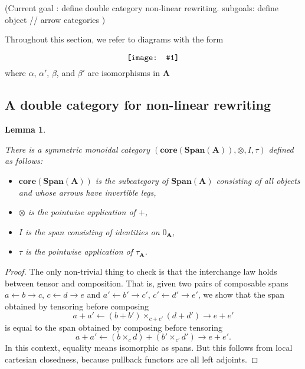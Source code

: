 \documentclass{amsart}
\newcommand{\A}{\cat{A}}
\newcommand{\core}{\mathbf{core}}
\newcommand{\cat}[1]{\mathbf{#1}}
\newcommand{\diagram}[1]{\raisebox{-0.5\height}{\texttt{[image: \#1]}}}
\newcommand{\Span}{\mathbf{Span}}
\newcommand{\edit}[1]{\textcolor{editcolour}{(#1)}}
\newtheorem{lemma}[theorem]{Lemma}
\theoremstyle{remark}
\theoremstyle{definition}
\begin{document}
\edit{Current goal : define double category non-linear
  rewriting. subgoals: define object // arrow categories }

Throughout this section, we refer to diagrams with the form
\begin{equation}
  \label{eq:nlr-2cell-form}
  \diagram{diag_nlr_dbl-rewrite-2cell}
\end{equation}
where $ \alpha $, $ \alpha' $, $ \beta $, and $ \beta' $ are isomorphisms in $ \A $



\subsection{A double category for non-linear rewriting}
\label{sec:dbl-cat-nonlinr-rewr}


\begin{lemma} \label{thm_dbl-rewr-obcat}

  There is a symmetric monoidal category
  $ ( \core (\Span (\A)) , \otimes , I , \tau ) $ defined as follows:

  \begin{itemize}
    \item $ \core (\Span (\A)) $ is the subcategory of $ \Span (\A) $
      consisting of all objects and whose arrows have invertible legs,
    \item $ \otimes $ is the pointwise application of $ + $,
    \item $ I $ is the span consisting of identities on $ 0_{\A} $,
    \item $ \tau $ is the pointwise application of $ \tau_{\A} $.
  \end{itemize}
    
\end{lemma}

\begin{proof}
  
  The only non-trivial thing to check is that the interchange law
  holds between tensor and composition.  That is, given two pairs of
  composable spans $ a \gets b \to c $, $ c \gets d \to e $ and
  $ a' \gets b' \to c' $, $ c' \gets d' \to e' $, we show that the
  span obtained by tensoring before composing
  \[
    a + a' \gets (b + b') \times_{c + c'} (d + d') \to e + e'
  \]
  is equal to the span obtained by composing before tensoring
  \[
    a + a' \gets (b \times_{c} d) + (b' \times_{c'} d') \to e + e'.
  \]
  In this context, equality means isomorphic as spans. But this
  follows from local cartesian closedness, because pullback functors
  are all left adjoints.
  
\end{proof}
\end{document}
